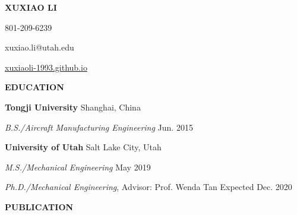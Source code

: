 \documentclass[11pt, letterpaper]{article}
\begin{document}
\begin{center}
   \textbf{\Large XUXIAO LI}

   \large 801-209-6239

   \large xuxiao.li@utah.edu

   \href{xuxiaoli-1993.github.io}{xuxiaoli-1993.github.io}
   \paraspace
\end{center}

\textbf{EDUCATION}

\fullrule

\textbf{Tongji University} 
\hfill
Shanghai, China

\textit{B.S./Aircraft Manufacturing Engineering} \hfill Jun. 2015

\vspace{6pt}
\textbf{University of Utah} \hfill Salt Lake City, Utah

\textit{M.S./Mechanical Engineering} \hfill May 2019

\textit{Ph.D./Mechanical Engineering}, Advisor: Prof. Wenda Tan \hfill Expected Dec. 2020
\paraspace

\textbf{PUBLICATION}

\fullrule
\end{document}
